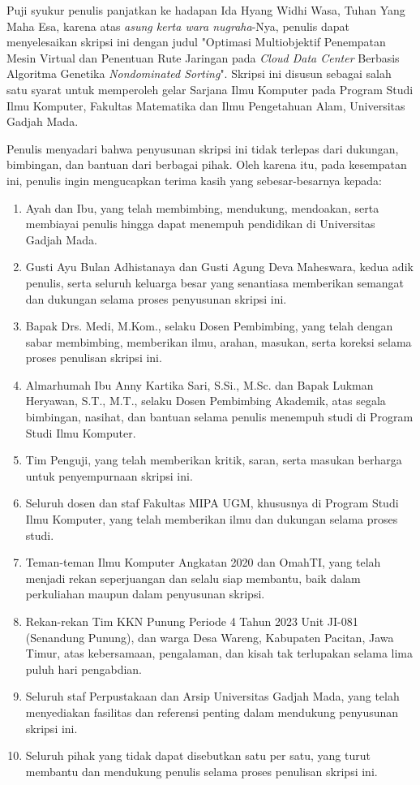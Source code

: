 Puji syukur penulis panjatkan ke hadapan Ida Hyang Widhi Wasa, Tuhan Yang Maha Esa, karena atas \textit{asung kerta wara nugraha}-Nya, penulis dapat menyelesaikan skripsi ini dengan judul "Optimasi Multiobjektif Penempatan Mesin Virtual dan Penentuan Rute Jaringan pada \textit{Cloud Data Center} Berbasis Algoritma Genetika \textit{Nondominated Sorting}". Skripsi ini disusun sebagai salah satu syarat untuk memperoleh gelar Sarjana Ilmu Komputer pada Program Studi Ilmu Komputer, Fakultas Matematika dan Ilmu Pengetahuan Alam, Universitas Gadjah Mada.

Penulis menyadari bahwa penyusunan skripsi ini tidak terlepas dari dukungan, bimbingan, dan bantuan dari berbagai pihak. Oleh karena itu, pada kesempatan ini, penulis ingin mengucapkan terima kasih yang sebesar-besarnya kepada:

\begin{enumerate}
  \item Ayah dan Ibu, yang telah membimbing, mendukung, mendoakan, serta membiayai penulis hingga dapat menempuh pendidikan di Universitas Gadjah Mada.
  \item Gusti Ayu Bulan Adhistanaya dan Gusti Agung Deva Maheswara, kedua adik penulis, serta seluruh keluarga besar yang senantiasa memberikan semangat dan dukungan selama proses penyusunan skripsi ini.
  \item Bapak Drs. Medi, M.Kom., selaku Dosen Pembimbing, yang telah dengan sabar membimbing, memberikan ilmu, arahan, masukan, serta koreksi selama proses penulisan skripsi ini.
  \item Almarhumah Ibu Anny Kartika Sari, S.Si., M.Sc. dan Bapak Lukman Heryawan, S.T., M.T., selaku Dosen Pembimbing Akademik, atas segala bimbingan, nasihat, dan bantuan selama penulis menempuh studi di Program Studi Ilmu Komputer.
  \item Tim Penguji, yang telah memberikan kritik, saran, serta masukan berharga untuk penyempurnaan skripsi ini.
  \item Seluruh dosen dan staf Fakultas MIPA UGM, khususnya di Program Studi Ilmu Komputer, yang telah memberikan ilmu dan dukungan selama proses studi.
  \item Teman-teman Ilmu Komputer Angkatan 2020 dan OmahTI, yang telah menjadi rekan seperjuangan dan selalu siap membantu, baik dalam perkuliahan maupun dalam penyusunan skripsi.
  \item Rekan-rekan Tim KKN Punung Periode 4 Tahun 2023 Unit JI-081 (Senandung Punung), dan warga Desa Wareng, Kabupaten Pacitan, Jawa Timur, atas kebersamaan, pengalaman, dan kisah tak terlupakan selama lima puluh hari pengabdian.
  \item Seluruh staf Perpustakaan dan Arsip Universitas Gadjah Mada, yang telah menyediakan fasilitas dan referensi penting dalam mendukung penyusunan skripsi ini.
  \item Seluruh pihak yang tidak dapat disebutkan satu per satu, yang turut membantu dan mendukung penulis selama proses penulisan skripsi ini.
\end{enumerate}

